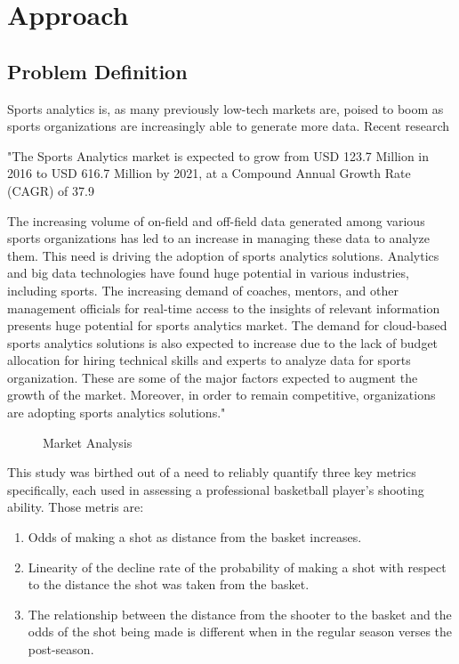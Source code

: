 \chapter{Approach}\label{chap:approach}

\section{Problem Definition}
Sports analytics is, as many previously low-tech markets are, poised to boom as sports organizations are increasingly able to generate more data.  Recent research

\begin{displayquote}
    "The Sports Analytics market is expected to grow from USD 123.7 Million in 2016 to USD 616.7 Million by 2021, at a Compound Annual Growth Rate (CAGR) of 37.9%

    The increasing volume of on-field and off-field data generated among various sports organizations has led to an increase in managing these data to analyze them. This need is driving the adoption of sports analytics solutions. Analytics and big data technologies have found huge potential in various industries, including sports. The increasing demand of coaches, mentors, and other management officials for real-time access to the insights of relevant information presents huge potential for sports analytics market. The demand for cloud-based sports analytics solutions is also expected to increase due to the lack of budget allocation for hiring technical skills and experts to analyze data for sports organization. These are some of the major factors expected to augment the growth of the market. Moreover, in order to remain competitive, organizations are adopting sports analytics solutions."
\end{displayquote}

\cite{market}
\vskip 1cm
    \begin{figure}
    \caption{\label{fig:marketsandmarkets} Market Analysis}
\end{figure}
\vskip 1cm
\par
\indent This study was birthed out of a need to reliably quantify three key metrics specifically, each used in assessing a professional basketball player's shooting ability.  Those metris are:


\begin{enumerate}
    \item Odds of making a shot as distance from the basket increases.

    \item Linearity of the decline rate of the probability of making a shot with respect to the distance the shot was taken from the basket.

    \item The relationship between the distance from the shooter to the basket and the odds of the shot being made is different when in the regular season verses the post-season.
\end{enumerate}

